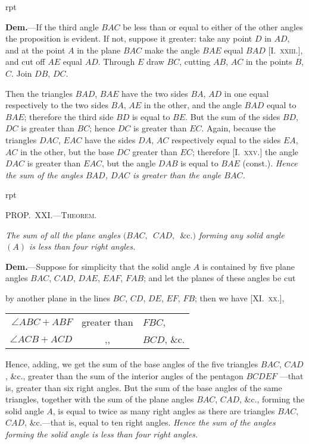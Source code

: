 \documentclass[oneside]{book}
\newcounter{wrapwidth}
\newcommand\mypropflot[5]{
\vspace{0.5\baselineskip}
\bigskip\Needspace*{4\baselineskip}
\setcounter{wrapwidth}{#3}
\begin{wrapfigure}[#4]{r}{\value{wrapwidth}pt}
\begin{center}
\vspace{-0.3in}

\end{center}
\end{wrapfigure}
\hspace{1.5\parindent}\textsc{#1}\par\medskip
\indent\emph{#2}\par\medskip
}
\newcommand\imgflow[3]{
\setcounter{wrapwidth}{#1}

\begin{wrapfigure}[#2]{r}{\value{wrapwidth}pt}
\begin{center}
\vspace{-0.3in}

\end{center}
\end{wrapfigure}
}
\begin{document}
\imgflow{150}{8}{f234}

\textbf{Dem.}---If the third angle $BAC$ be less than or equal
to either of the other
angles the proposition is
evident. If not, suppose it
greater: take any point
$D$ in $AD$, and at the
point $A$ in the plane $BAC$
make the angle $BAE$
equal $BAD$ [I.~\textsc{xxiii.}],
and cut off $AE$ equal $AD$. Through $E$ draw $BC$, cutting
$AB$, $AC$ in the points $B$, $C$. Join $DB$, $DC$.

Then the triangles $BAD$, $BAE$ have the two sides
$BA$, $AD$ in one equal respectively to the two sides
$BA$, $AE$ in the other, and the angle $BAD$ equal to
$BAE$; therefore the third side $BD$ is equal to $BE$.
But the sum of the sides $BD$, $DC$ is greater than $BC$;
hence $DC$ is greater than $EC$. Again, because the
triangles $DAC$, $EAC$ have the sides $DA$, $AC$ respectively
equal to the sides $EA$, $AC$ in the other, but the
base $DC$ greater than $EC$; therefore [I.~\textsc{xxv.}] the angle
$DAC$ is greater than $EAC$, but the angle $DAB$ is equal
to $BAE$ (const.). \emph{Hence the sum of the angles $BAD$,
$DAC$  is greater than the angle $BAC$.}


\mypropflot{PROP\@.~XXI\@.---Theorem.}{The sum of all the plane angles
$(BAC,$\ $CAD,$\ $\&\mathrm{c}.)$ forming
any solid angle $(A)$ is less than four right angles.}{128}{10}{f235}

\textbf{Dem.}---Suppose for simplicity that the solid angle $A$
is contained by five plane angles $BAC$, $CAD$, $DAE$,
$EAF$, $FAB$; and let the planes of these angles be cut

by another plane in the lines $BC$, $CD$, $DE$, $EF$, $FB$;
then we have [XI\@.~\textsc{xx.}],
\begin{center}
\begin{tabular}{r@{\ }c@{\ }l}
$\angle ABC + ABF$ & greater than & $FBC$, \\[1ex]
$\angle ACB + ACD$ &      ,,      & $BCD$, \&c.
\end{tabular}
\end{center}
Hence, adding, we get the sum
of the base angles of the five
triangles $BAC$, $CAD$, \&c.,
greater than the sum of the
interior angles of the pentagon
$BCDEF$ ---that is, greater than
six right angles. But the sum
of the base angles of the same
triangles, together with the
sum of the plane angles $BAC$,
$CAD$, \&c., forming the solid
angle $A$, is equal to twice as
many right angles as there are triangles $BAC$, $CAD$,
\&c.---that is, equal to ten right angles. \emph{Hence the sum
of the angles forming the solid angle is less than four
right angles.}
\end{document}
